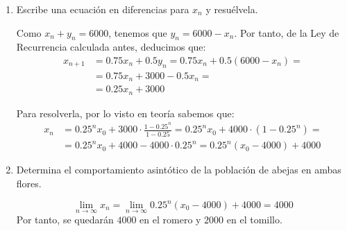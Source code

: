 \begin{ejercicio}
\begin{enumerate}
        \item Escribe una ecuación en diferencias para $x_n$ y resuélvela.

        Como $x_n+y_n=6000$, tenemos que $y_n = 6000 - x_n$. Por tanto, de la Ley de Recurrencia calculada antes, deducimos que:
        \begin{align*}
            x_{n+1} &= 0.75x_n + 0.5y_n
            = 0.75x_n + 0.5\left(6000 - x_n\right)
            =\\&= 0.75x_n + 3000 - 0.5 x_n =\\&= 0.25x_n + 3000
        \end{align*}

        Para resolverla, por lo visto en teoría sabemos que:
        \begin{align*}
            x_n &= 0.25^n x_0 + 3000\cdot \frac{1-0.25^n}{1-0.25} = 0.25^n x_0 + 4000\cdot\left(1-0.25^n\right)
            =\\&= 0.25^n x_0 + 4000 - 4000\cdot 0.25^n = 0.25^n \left(x_0-4000\right) + 4000
        \end{align*}
        
        \item Determina el comportamiento asintótico de la población de abejas en ambas flores.

        $$\lim_{n\to \infty}x_n = \lim_{n\to \infty}  0.25^n \left(x_0-4000\right) + 4000 = 4000$$
        Por tanto, se quedarán $4000$ en el romero y $2000$ en el tomillo.    
    \end{enumerate}
\end{ejercicio}






